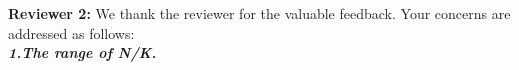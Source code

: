 {\color{blue}\textbf{Reviewer 2:}} We thank the reviewer for the valuable feedback. Your concerns are addressed as follows: \\
\textbf{\textit{1.The range of N/K.}}

